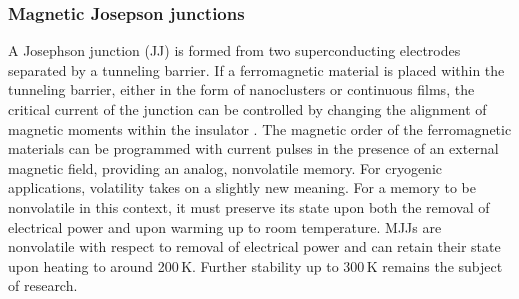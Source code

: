 \documentclass[twocolumn]{article}
\begin{document}
\subsubsection{Magnetic Josepson junctions}
A Josephson junction (JJ) is formed from two superconducting electrodes separated by a tunneling barrier. If a ferromagnetic material is placed within the tunneling barrier, either in the form of nanoclusters or continuous films, the critical current of the junction can be controlled by changing the alignment of magnetic moments within the insulator \cite{schneider2018ultralow}. The magnetic order of the ferromagnetic materials can be programmed with current pulses in the presence of an external magnetic field, providing an analog, nonvolatile memory. For cryogenic applications, volatility takes on a slightly new meaning. For a memory to be nonvolatile in this context, it must preserve its state upon both the removal of electrical power and upon warming up to room temperature. MJJs are nonvolatile with respect to removal of electrical power and can retain their state upon heating to around 200\,K. Further stability up to 300\,K remains the subject of research. 
\end{document}
